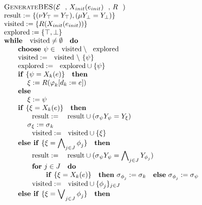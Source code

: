 {\small 
\begin{equation*}
\begin{array}{l}
\text{\textsc{GenerateBES(}}\mathcal{E}\text{, }X_{init}(e_{init})\text{, }R%
\text{\textsc{)}} \\ 
\text{result}:=\{(\nu Y_{\top }=Y_{\top }),(\mu Y_{\bot }=Y_{\bot })\} \\ 
\text{visited}:=\{R(X_{init}(e_{init}))\} \\ 
\text{explored}:=\{\top ,\bot \} \\ 
\text{\textbf{while }}\text{visited}\neq \emptyset \text{ \textbf{do}} \\ 
\qquad \text{\textbf{choose }}\psi \in \text{visited}\setminus \text{explored%
} \\ 
\qquad \text{visited}:=\text{visited}\ \backslash \ \{\psi \} \\ 
\qquad \text{explored}:=\text{explored}\cup \{\psi \} \\ 
\qquad \text{\textbf{if} }\{\psi =X_{k}(e)\}\text{ \textbf{then}} \\ 
\qquad \qquad \xi :=R(\varphi _{k}[d_{k}:=e]) \\ 
\qquad \text{\textbf{else}} \\ 
\qquad \qquad \xi :=\psi \\ 
\qquad \text{\textbf{if} }\{\xi =X_{k}(e)\}\text{ \textbf{then}} \\ 
\qquad \qquad \text{result}:=\text{ result}\cup (\sigma _{\psi }Y_{\psi
}=Y_{\xi }) \\ 
\qquad \qquad \sigma _{\xi }:=\sigma _{k} \\ 
\qquad \qquad \text{visited}:=\text{visited}\cup \{\xi \} \\ 
\qquad \text{\textbf{else if} }\{\xi =\dbigwedge_{j\in J}\phi _{j}\}\text{ 
\textbf{then}} \\ 
\qquad \qquad \text{result}:=\text{ result}\cup (\sigma _{\psi }Y_{\psi
}=\dbigwedge_{j\in J}Y_{\phi _{j}}) \\ 
\qquad \qquad \text{\textbf{for} }j\in J\text{ \textbf{do}} \\ 
\qquad \qquad \qquad \text{\textbf{if} }\{\xi =X_{k}(e)\}\text{ \textbf{then}
}\sigma _{\phi _{j}}:=\sigma _{k}\text{ \textbf{else} }\sigma _{\phi
_{j}}:=\sigma _{\psi } \\ 
\qquad \qquad \text{visited}:=\text{visited}\cup \{\phi _{j}\}_{j\in J} \\ 
\qquad \text{\textbf{else if} }\{\xi =\dbigvee_{j\in J}\phi _{j}\}\text{ 
\textbf{then}} \\ 

\end{array}
\end{equation*}}
